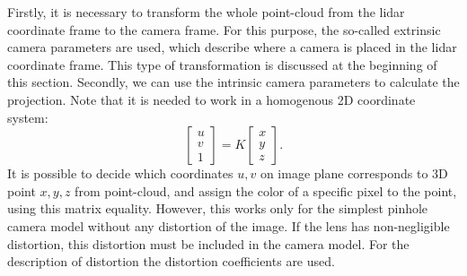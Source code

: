 Firstly, it is necessary to transform the whole point-cloud from the lidar coordinate frame to the camera frame. For this purpose, the so-called extrinsic camera parameters are used, which describe where a camera is placed in the lidar coordinate frame. This type of transformation is discussed at the beginning of this section. Secondly, we can use the intrinsic camera parameters to calculate the projection. Note that it is needed to work in a homogenous 2D coordinate system:
\begin{equation}
\begin{bmatrix}
u\\
v\\
1
\end{bmatrix}
= K \begin{bmatrix}
x\\
y\\
z
\end{bmatrix}.
\end{equation}
It is possible to decide which coordinates $u,v$ on image plane corresponds to 3D point $x,y,z$ from point-cloud, and assign the color of a specific pixel to the point, using this matrix equality. However, this works only for the simplest pinhole camera model without any distortion of the image. If the lens has non-negligible distortion, this distortion must be included in the camera model. For the description of distortion the distortion coefficients are used.